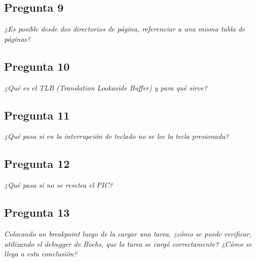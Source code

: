 \begin{minipage}{\linewidth}
	\subsection{Pregunta 9}
		\begin{minipage}{\linewidth}
			\textit{¿Es posible desde dos directorios de página, referenciar a una misma tabla de páginas?}
			
			
		\end{minipage}
\end{minipage}

\begin{minipage}{\linewidth}
	\subsection{Pregunta 10}
		\begin{minipage}{\linewidth}
			\textit{¿Qué es el TLB (Translation Lookaside Buffer) y para qué sirve?}
			
			
		\end{minipage}
\end{minipage}

\begin{minipage}{\linewidth}
	\subsection{Pregunta 11}
		\begin{minipage}{\linewidth}
			\textit{¿Qué pasa si en la interrupción de teclado no se lee la tecla presionada?}
			
			
		\end{minipage}
\end{minipage}

\begin{minipage}{\linewidth}
	\subsection{Pregunta 12}
		\begin{minipage}{\linewidth}
			\textit{¿Qué pasa si no se resetea el PIC?}
			
			
		\end{minipage}
\end{minipage}

\begin{minipage}{\linewidth}
	\subsection{Pregunta 13}
		\begin{minipage}{\linewidth}
			\textit{Colocando un breakpoint luego de la cargar una tarea, ¿cómo se puede verificar, utilizando el debugger de Bochs, que la tarea se cargó correctamente? ¿Cómo se llega a esta conclusión?}
			
			
		\end{minipage}
\end{minipage}

